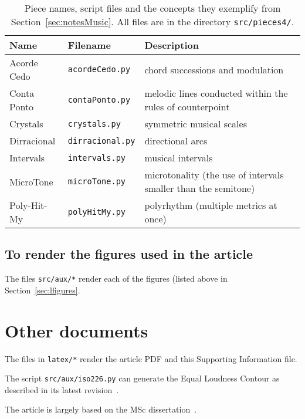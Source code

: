 \documentclass{scrreprt}
\begin{document}
\begin{table*}[htp!]
\centering
\caption{Piece names, script files and the concepts they exemplify from Section~\ref{sec:notesMusic}. All files are in the directory \texttt{src/pieces4/}.}
\begin{tabular}{ p{5cm} | p{3.5cm} | p{6.2cm} }
   Name & Filename & Description \\\hline
 Acorde Cedo & \texttt{acordeCedo.py} & chord successions and modulation \\
 Conta Ponto & \texttt{contaPonto.py} & melodic lines conducted within the rules of counterpoint \\
 Crystals & \texttt{crystals.py} & symmetric musical scales \\
 Dirracional & \texttt{dirracional.py} & directional arcs \\
 Intervals & \texttt{intervals.py} & musical intervals \\
 MicroTone & \texttt{microTone.py} & microtonality (the use of intervals smaller than the semitone) \\
 Poly-Hit-My & \texttt{polyHitMy.py} & polyrhythm (multiple metrics at once) \\
\end{tabular}
\end{table*}

\clearpage
\subsection{To render the figures used in the article}
The files \texttt{src/aux/*} render each of the figures (listed above in Section~\ref{sec:lfigures}.

\clearpage
\section{Other documents}
The files in \texttt{latex/*} render the article PDF and this Supporting Information file.

The script \texttt{src/aux/iso226.py} can generate the Equal Loudness Contour as described in its latest revision~\cite{iso226}.

The article is largely based on the MSc dissertation~\cite{dissertacao}.
\end{document}
